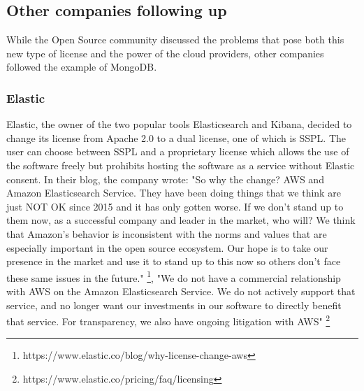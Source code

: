 \documentclass[12pt, a4paper]{article}
\begin{document}

  \subsection{Other companies following up}
  While the Open Source community discussed the problems that pose both this new type of license and the power of the cloud providers, other companies followed the example of MongoDB. 

  \subsubsection{Elastic}
  Elastic, the owner of the two popular tools Elasticsearch and Kibana, decided to change its license from Apache 2.0 to a dual license, one of which is SSPL. The user can choose between SSPL and a proprietary license which allows the use of the software freely but prohibits hosting the software as a service without Elastic consent. In their blog, the company wrote: "So why the change? AWS and Amazon Elasticsearch Service. They have been doing things that we think are just NOT OK since 2015 and it has only gotten worse. If we don't stand up to them now, as a successful company and leader in the market, who will? We think that Amazon's behavior is inconsistent with the norms and values that are especially important in the open source ecosystem. Our hope is to take our presence in the market and use it to stand up to this now so others don't face these same issues in the future." \footnote{https://www.elastic.co/blog/why-license-change-aws}, "We do not have a commercial relationship with AWS on the Amazon Elasticsearch Service. We do not actively support that service, and no longer want our investments in our software to directly benefit that service. For transparency, we also have ongoing litigation with AWS" \footnote{https://www.elastic.co/pricing/faq/licensing}
\end{document}
